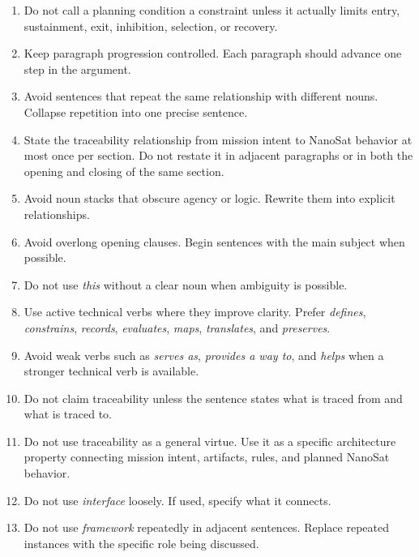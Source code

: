 \documentclass[11pt]{article}
\begin{document}
\begin{enumerate}
\item Do not call a planning condition a constraint unless it actually limits entry, sustainment, exit, inhibition, selection, or recovery.

\item Keep paragraph progression controlled. Each paragraph should advance one step in the argument.

\item Avoid sentences that repeat the same relationship with different nouns. Collapse repetition into one precise sentence.

\item State the traceability relationship from mission intent to NanoSat behavior at most once per section. Do not restate it in adjacent paragraphs or in both the opening and closing of the same section.

\item Avoid noun stacks that obscure agency or logic. Rewrite them into explicit relationships.

\item Avoid overlong opening clauses. Begin sentences with the main subject when possible.

\item Do not use \emph{this} without a clear noun when ambiguity is possible.

\item Use active technical verbs where they improve clarity. Prefer \emph{defines}, \emph{constrains}, \emph{records}, \emph{evaluates}, \emph{maps}, \emph{translates}, and \emph{preserves}.

\item Avoid weak verbs such as \emph{serves as}, \emph{provides a way to}, and \emph{helps} when a stronger technical verb is available.

\item Do not claim traceability unless the sentence states what is traced from and what is traced to.

\item Do not use traceability as a general virtue. Use it as a specific architecture property connecting mission intent, artifacts, rules, and planned NanoSat behavior.

\item Do not use \emph{interface} loosely. If used, specify what it connects.

\item Do not use \emph{framework} repeatedly in adjacent sentences. Replace repeated instances with the specific role being discussed.


\end{enumerate}
\end{document}
